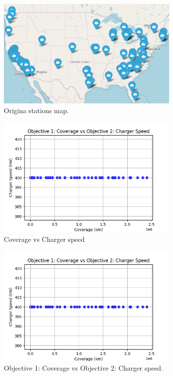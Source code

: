 \documentclass[12pt]{report}
\begin{document}
\begin{figure}[h!]
    \centering
    \includegraphics[width=0.8\textwidth]{Figures/original_map.PNG}
    \caption{Origina stations map.}
    \label{fig:original_map}
\end{figure}



\begin{figure}[h!]
    \centering
    \includegraphics[width=0.8\textwidth]{Figures/Figure_1.png} 
    \caption{Coverage vs Charger speed}
    \label{fig:Coverage vs Charger speed}
\end{figure}




\begin{figure}[h!]
    \centering
    \includegraphics[width=0.8\textwidth]{Figures/Figure_1.png} 
    \caption{Objective 1: Coverage vs Objective 2: Charger speed.}
    \label{fig:your_image_label}
\end{figure}
\end{document}
